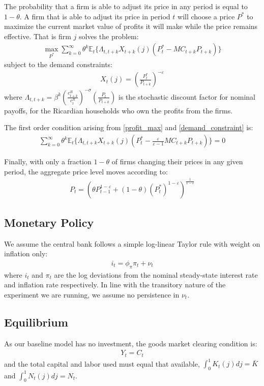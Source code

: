 \documentclass[titlepage]{\econtex}\newcommand{\texname}{ConsumptionHeterogeneity}
\begin{document}
The probability that a firm is able to adjust its price in any period is equal to $1-\theta$. A firm that is able to adjust its price in period $t$ will choose a price $P^*$ to maximize the current market value of profits it will make while the price remains effective. That is firm $j$ solves the problem:
\begin{align}
\underset{P^*}{\max} \sum_{k=0}^{\infty} \theta^k \mathbb{E}_t \{{\Lambda}_{t,t+k} X_{t+k}(j) (P_t^* - MC_{t+k}P_{t+k}) \} \label{profit_max}
\end{align}
subject to the demand constraints:
\begin{align}
X_t(j) = \left(\frac{P_t^*}{P_{t+k}}\right)^{-\varepsilon} \label{demand_constraint}
\end{align}
where ${\Lambda}_{t,t+k} = \beta^k \left(\frac{c^R_{t+k}}{c^R_{t}}\right)^{-\sigma} \left( \frac{P_t}{P_{t+k}} \right)$ is the stochastic discount factor for nominal payoffs, for the Ricardian households who own the profits from the firms. 

The first order condition arising from \ref{profit_max}  and \ref{demand_constraint} is:
\begin{align}
\sum_{k=0}^{\infty} \theta^k \mathbb{E}_t \Big\{{\Lambda}_{t,t+k} X_{t+k}(j) \left(P_t^* - \frac{\varepsilon}{\varepsilon-1}MC_{t+k} P_{t+k}\right)  \Big\} = 0 \label{foc_pricing}
\end{align}

Finally, with only a fraction $1-\theta$ of firms changing their prices in any given period, the aggregate price level moves according to:
\begin{align*}
P_t = \left(   \theta P_{t-1}^{1-\varepsilon} + (1-\theta)(P_t^*)^{1-\varepsilon}\right)^{\frac{1}{1-\varepsilon}}
\end{align*}

\subsection{Monetary Policy}
We assume the central bank follows a simple log-linear Taylor rule with weight on inflation only:
\begin{align}
i_t = \phi_{\pi} \pi_t + \nu_t	\label{taylor_rule}
\end{align}
where $i_t$ and $\pi_t$ are the log deviations from the nominal steady-state interest rate and inflation rate respectively. In line with the transitory nature of the experiment we are running, we assume no persistence in $\nu_t$.

\subsection{Equilibrium}
As our baseline model has no investment, the goods market clearing condition is:
\begin{align}
Y_t = C_t	\label{agg_prod}
\end{align}
and the total capital and labor used must equal that available, $\int_0^1 K_t(j)dj = \bar{K}$ and $\int_0^1 N_t(j)dj = N_t$.
\end{document}
